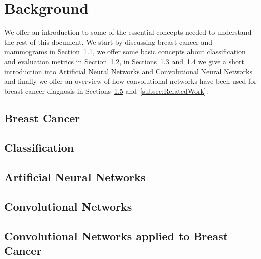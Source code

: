 \documentclass[11pt]{article}
\begin{document}
\section{Background}
\label{sec:Background}
We offer an introduction to some of the essential concepts needed to understand the rest of this document. We start by discussing breast cancer and mammograms in Section~\ref{subsec:BreastCancer}, 
we offer some basic concepts about classification and evaluation metrics in Section~\ref{subsec:Classification}, in Sections~\ref{subsec:ANNs} and~\ref{subsec:ConvNets} we give a short introduction into Artificial Neural Networks and Convolutional Neural Networks and finally we offer an overview of how convolutional networks have been used for breast cancer diagnosis in Sections~\ref{subsec:BreastCancerConvNets} and~\ref{subsec:RelatedWork}.

	\subsection{Breast Cancer}
	\label{subsec:BreastCancer}
	


	\subsection{Classification}
	\label{subsec:Classification}
	

	\subsection{Artificial Neural Networks}
	\label{subsec:ANNs}

	\subsection{Convolutional Networks}
	\label{subsec:ConvNets}

	\subsection{Convolutional Networks applied to Breast Cancer}
	\label{subsec:BreastCancerConvNets}	
\end{document}
